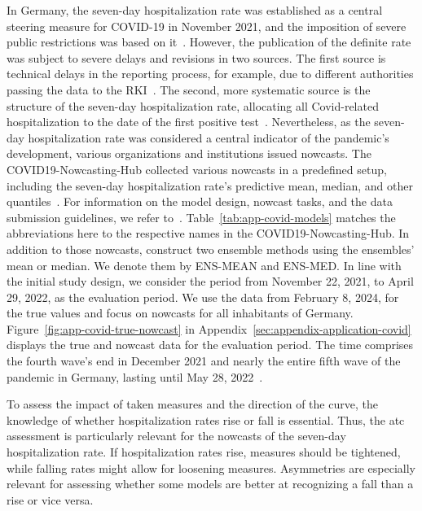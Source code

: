\documentclass[pdflatex]{sn-jnl}
\theoremstyle{plain}%
\theoremstyle{definition}
\begin{document}
In Germany, the seven-day hospitalization rate was established as a central steering measure for COVID-19 in November 2021, and the imposition of severe public restrictions was based on it~\citep{RobertKochInstitute2021}.
However, the publication of the definite rate was subject to severe delays and revisions in two sources.
The first source is technical delays in the reporting process, for example, due to different authorities passing the data to the RKI~\citep{RobertKochInstitute2024}.
The second, more systematic source is the structure of the seven-day hospitalization rate, allocating all Covid-related hospitalization to the date of the first positive test~\parencite[for a detailed description, see][]{Wolffram2023}.
Nevertheless, as the seven-day hospitalization rate was considered a central indicator of the pandemic's development, various organizations and institutions issued nowcasts.
The COVID19-Nowcasting-Hub collected various nowcasts in a predefined setup, including the seven-day hospitalization rate's predictive mean, median, and other quantiles~\citep{ChairOfEconometricsAndStatisticsAtKarlsruheInstituteOfTechnology2024}.
For information on the model design, nowcast tasks, and the data submission guidelines, we refer to~\citet{Wolffram2023}.
Table~\ref{tab:app-covid-models} matches the abbreviations here to the respective names in the COVID19-Nowcasting-Hub.
In addition to those nowcasts, \citet{Wolffram2023} construct two ensemble methods using the ensembles' mean or median.
We denote them by ENS-MEAN and ENS-MED.
In line with the initial study design, we consider the period from November 22, 2021, to April 29, 2022, as the evaluation period.
We use the data from February 8, 2024, for the true values and focus on nowcasts for all inhabitants of Germany.
Figure~\ref{fig:app-covid-true-nowcast} in Appendix~\ref{sec:appendix-application-covid} displays the true and nowcast data for the evaluation period.
The time comprises the fourth wave's end in December 2021 and nearly the entire fifth wave of the pandemic in Germany, lasting until May 28, 2022~\citep{Tolksdorf2022}.

To assess the impact of taken measures and the direction of the curve, the knowledge of whether hospitalization rates rise or fall is essential.
Thus, the \ac{atc} assessment is particularly relevant for the nowcasts of the seven-day hospitalization rate.
If hospitalization rates rise, measures should be tightened, while falling rates might allow for loosening measures.
Asymmetries are especially relevant for assessing whether some models are better at recognizing a fall than a rise or vice versa.
\end{document}
